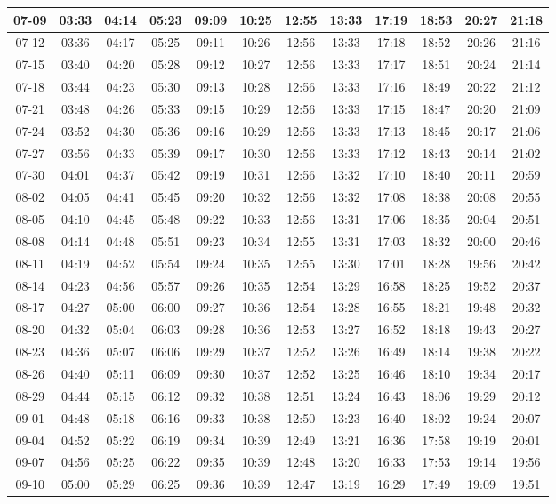 \begin{footnotesize}
\begin{tabular}{c | c | c| c| c| c| c| c| c| c| c| c}
		07-09&03:33&04:14&05:23&09:09&10:25&12:55&13:33&17:19&18:53&20:27&21:18\\\hline
		07-12&03:36&04:17&05:25&09:11&10:26&12:56&13:33&17:18&18:52&20:26&21:16\\\hline
		07-15&03:40&04:20&05:28&09:12&10:27&12:56&13:33&17:17&18:51&20:24&21:14\\\hline
		07-18&03:44&04:23&05:30&09:13&10:28&12:56&13:33&17:16&18:49&20:22&21:12\\\hline
		07-21&03:48&04:26&05:33&09:15&10:29&12:56&13:33&17:15&18:47&20:20&21:09\\\hline
		07-24&03:52&04:30&05:36&09:16&10:29&12:56&13:33&17:13&18:45&20:17&21:06\\\hline
		07-27&03:56&04:33&05:39&09:17&10:30&12:56&13:33&17:12&18:43&20:14&21:02\\\hline
		07-30&04:01&04:37&05:42&09:19&10:31&12:56&13:32&17:10&18:40&20:11&20:59\\\hline
		08-02&04:05&04:41&05:45&09:20&10:32&12:56&13:32&17:08&18:38&20:08&20:55\\\hline
		08-05&04:10&04:45&05:48&09:22&10:33&12:56&13:31&17:06&18:35&20:04&20:51\\\hline
		08-08&04:14&04:48&05:51&09:23&10:34&12:55&13:31&17:03&18:32&20:00&20:46\\\hline
		08-11&04:19&04:52&05:54&09:24&10:35&12:55&13:30&17:01&18:28&19:56&20:42\\\hline
		08-14&04:23&04:56&05:57&09:26&10:35&12:54&13:29&16:58&18:25&19:52&20:37\\\hline
		08-17&04:27&05:00&06:00&09:27&10:36&12:54&13:28&16:55&18:21&19:48&20:32\\\hline
		08-20&04:32&05:04&06:03&09:28&10:36&12:53&13:27&16:52&18:18&19:43&20:27\\\hline
		08-23&04:36&05:07&06:06&09:29&10:37&12:52&13:26&16:49&18:14&19:38&20:22\\\hline
		08-26&04:40&05:11&06:09&09:30&10:37&12:52&13:25&16:46&18:10&19:34&20:17\\\hline
		08-29&04:44&05:15&06:12&09:32&10:38&12:51&13:24&16:43&18:06&19:29&20:12\\\hline
		09-01&04:48&05:18&06:16&09:33&10:38&12:50&13:23&16:40&18:02&19:24&20:07\\\hline
		09-04&04:52&05:22&06:19&09:34&10:39&12:49&13:21&16:36&17:58&19:19&20:01\\\hline
		09-07&04:56&05:25&06:22&09:35&10:39&12:48&13:20&16:33&17:53&19:14&19:56\\\hline
		09-10&05:00&05:29&06:25&09:36&10:39&12:47&13:19&16:29&17:49&19:09&19:51\\\hline

\end{tabular}
\end{footnotesize}
